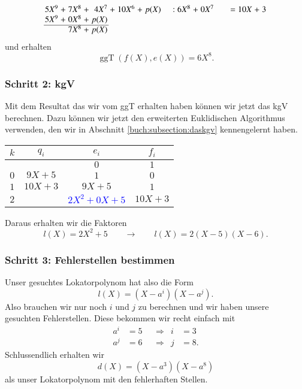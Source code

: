 \[
\arraycolsep=1.4pt
\begin{array}{rcrcrcrcccrcrcrcrcrcrcrcrcr}
	5X^9&+& 7X^8&+& 4X^7&+& 10X^6&+& p(X)& & & & &:&6X^8&+&0X^7& & & & & & &=&10X&+&3\\
	5X^9&+& 0X^8&+& p(X)& & & & & &  & & & &   & & & & & &   & &  & & \\ \cline{1-5}
	&& 7X^8&+& p(X)& & & & & &   & & & & & &   & &  & & \\
\end{array}
\]
und erhalten
\[
\operatorname{ggT}(f(X),e(X)) = 6X^8.
\]

\subsubsection{Schritt 2: kgV}

Mit dem Resultat das wir vom ggT erhalten haben können wir jetzt das kgV berechnen. Dazu können wir jetzt den erweiterten Euklidischen Algorithmus verwenden, den wir in Abschnitt \ref{buch:subsection:daskgv} kennengelernt haben.
%
%
\begin{center}
	
	\begin{tabular}{| c | c | c c |}
		\hline
		$k$ &  $q_i$ & $e_i$ & $f_i$\\
		\hline 
		& & $0$& $1$\\
		$0$& $9X + 5$& $1$& $0$\\
		$1$& $10X + 3$& $9X+5$& $1$\\
		$2$& & \textcolor{blue}{$2X^2 + 0X + 5$}& $10X + 3$\\
		\hline
	\end{tabular}	
	
\end{center}
Daraus erhalten wir die Faktoren
\[
l(X) = 2X^2 + 5 \qquad \rightarrow \qquad l(X) = 2(X-5)(X-6).
\]
\subsubsection{Schritt 3: Fehlerstellen bestimmen}
Unser gesuchtes Lokatorpolynom hat also die Form
\[
l(X) = (X-a^i)(X-a^j).
\]
Also brauchen wir nur noch $i$ und $j$ zu berechnen und wir haben unsere gesuchten Fehlerstellen.
Diese bekommen wir recht einfach mit
\begin{equation*}
\begin{aligned}
	a^i &= 5 &&\Rightarrow & i &= 3\\
	a^j &= 6 &&\Rightarrow & j &= 8.
\end{aligned}
\end{equation*}
Schlussendlich erhalten wir
\[
d(X) = (X-a^3)(X-a^8)
\]
als unser Lokatorpolynom mit den fehlerhaften Stellen.
